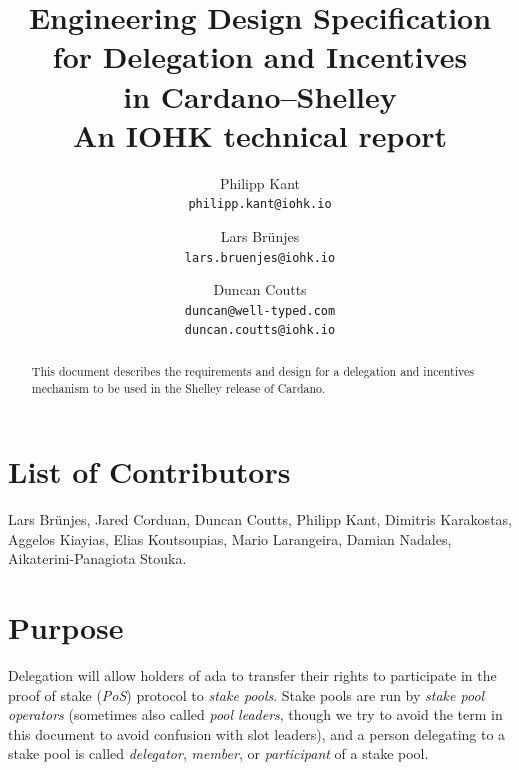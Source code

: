 \documentclass[11pt,a4paper,dvipsnames,twosided]{article}
\begin{document}
\title{Engineering Design Specification \\
  for Delegation and Incentives \\
  in Cardano--Shelley \\
  {\large \sc An IOHK technical report}}

\author{Philipp Kant   \\ {\small \texttt{philipp.kant@iohk.io}} \\
   \and Lars Br\"unjes \\ {\small \texttt{lars.bruenjes@iohk.io}} \\
   \and Duncan Coutts  \\ {\small \texttt{duncan@well-typed.com}} \\
                          {\small \texttt{duncan.coutts@iohk.io}}}
\maketitle

\begin{abstract}
This document describes the requirements and design for a delegation and
incentives mechanism to be used in the Shelley release of Cardano.
\end{abstract}

\section*{List of Contributors}
\label{acknowledgements}

Lars Br\"unjes, Jared Corduan, Duncan Coutts, Philipp Kant,
Dimitris Karakostas, Aggelos Kiayias, Elias Koutsoupias, Mario
Larangeira, Damian Nadales, Aikaterini-Panagiota Stouka.

\tableofcontents
\listoffigures
\listoftodos

\section{Purpose}
\label{purpose}

Delegation will allow holders of ada to transfer their rights to participate in
the proof of stake (\emph{PoS}) protocol to \emph{stake pools}. Stake pools are
run by \emph{stake pool operators} (sometimes also called \emph{pool leaders},
though we try to avoid the term in this document to avoid confusion with slot
leaders), and a person delegating to a stake pool is called \emph{delegator},
\emph{member}, or \emph{participant} of a stake pool.
\end{document}
